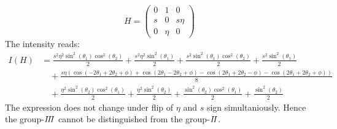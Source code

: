 \documentclass[prd,preprintnumbers,floatfix,
nofootinbib,superscriptaddress]{revtex4}
\begin{document}
\begin{equation}
  H = \begin{pmatrix}
    0 &1 &0 \\
    s & 0 &s\eta \\
    0 &\eta &0
  \end{pmatrix}
\end{equation}
The intensity reads:
\begin{align}
  I(H) &= \frac{s^{2} \eta^{2} \sin^{2}{\left (\theta_{1} \right )} \cos^{2}{\left (\theta_{2} \right )}}{2} + \frac{s^{2} \eta^{2} \sin^{2}{\left (\theta_{1} \right )}}{2} + \frac{s^{2} \sin^{2}{\left (\theta_{1} \right )} \cos^{2}{\left (\theta_{2} \right )}}{2} + \frac{s^{2} \sin^{2}{\left (\theta_{1} \right )}}{2} \\ \nonumber
   &\quad + \frac{s \eta \left(\cos{\left (- 2 \theta_{1} + 2 \theta_{2} + \phi \right )} + \cos{\left (2 \theta_{1} - 2 \theta_{2} + \phi \right )} - \cos{\left (2 \theta_{1} + 2 \theta_{2} - \phi \right )} - \cos{\left (2 \theta_{1} + 2 \theta_{2} + \phi \right )}\right)}{8}\\ \nonumber
   &\quad+\frac{\eta^{2} \sin^{2}{\left (\theta_{2} \right )} \cos^{2}{\left (\theta_{1} \right )}}{2} + \frac{\eta^{2} \sin^{2}{\left (\theta_{2} \right )}}{2} + \frac{\sin^{2}{\left (\theta_{2} \right )} \cos^{2}{\left (\theta_{1} \right )}}{2} + \frac{\sin^{2}{\left (\theta_{2} \right )}}{2}
\end{align}
The expression does not change under flip of $\eta$ and $s$ sign simultaniously.
Hence the group-${I\!I\!I}$ cannot be distinguished from the group-${I\!I}$.


\end{document}

